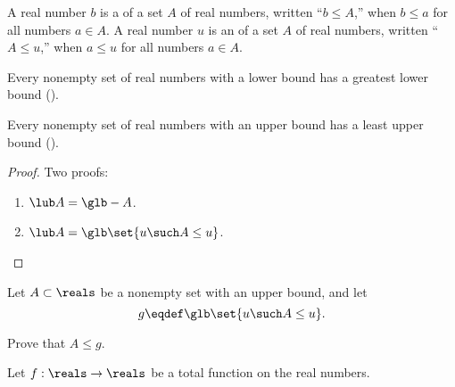 A real number $b$ is a  of a set $A$ of real
numbers, written ``$b \leq A$,'' when $b \leq a$ for all numbers $a
\in A$.  A real number $u$ is an  of a set $A$ of
real numbers, written ``$A \leq u$,'' when $a \leq u$ for all numbers
$a \in A$.

\begin{axiom}
Every nonempty set of real numbers with a lower bound has a greatest lower bound (\glb).
\end{axiom}

\begin{corollary}
Every nonempty set of real numbers with an upper bound has a least
upper bound (\lub).
\end{corollary}

\begin{proof}
Two proofs:

\begin{enumerate}(i)
\item $\lub A = \glb -A$.
\item $\lub A =  \glb\set{u \such A \leq u}$.
\end{enumerate}
\end{proof}

\begin{problem}
Let $A \subset \reals$ be a nonempty set with an upper bound, and let
\[
g \eqdef \glb\set{u \such A \leq u}.
\]

Prove that $A \leq g$.

\begin{solution}
\end{solution}
\end{problem}

Let $f:\reals \to \reals$ be a total function on the real numbers.
